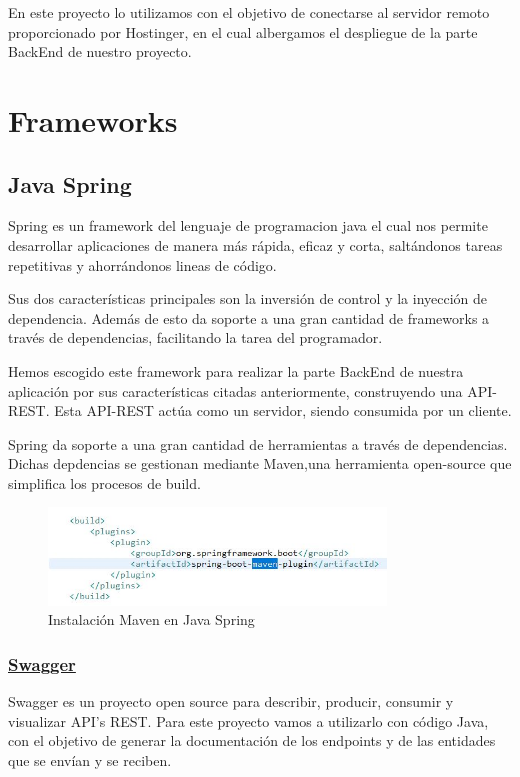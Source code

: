      En este proyecto lo utilizamos con el objetivo de conectarse al servidor remoto proporcionado por Hostinger\cite{hostinger}, en el cual albergamos el despliegue de la parte BackEnd de nuestro proyecto.\newpage
     
     
     \section{Frameworks}
     
     \subsection{Java Spring}
     Spring es un framework del lenguaje de programacion java el cual nos permite desarrollar aplicaciones de manera más rápida, eficaz y corta, saltándonos tareas repetitivas y ahorrándonos lineas de código\cite{javaspring}.
     \newline
     
     Sus dos características principales son la inversión de control y la inyección de dependencia. Además de esto da soporte a una gran cantidad de frameworks a través de dependencias, facilitando la tarea del programador.
     \newline
     
     Hemos escogido este framework para realizar la parte BackEnd de nuestra aplicación por sus características citadas anteriormente, construyendo una API-REST. Esta API-REST actúa como un servidor, siendo consumida por un cliente.
     \newline
    
    Spring da soporte a una gran cantidad de herramientas a través de dependencias. Dichas depdencias se gestionan mediante Maven,una herramienta open-source que simplifica los procesos de build.
    
    \begin{figure}[h]
    \centering
    \includegraphics[width=0.8\textwidth]{images/maven}
    \caption{Instalación Maven en Java Spring}
    \end{figure}
    
    

        \subsubsection{\underline{Swagger}}
        Swagger es un proyecto open source para describir, producir, consumir y visualizar API’s REST. Para este proyecto vamos a utilizarlo con código Java, con el objetivo de generar la documentación de los endpoints y de las entidades que se envían y se reciben.

